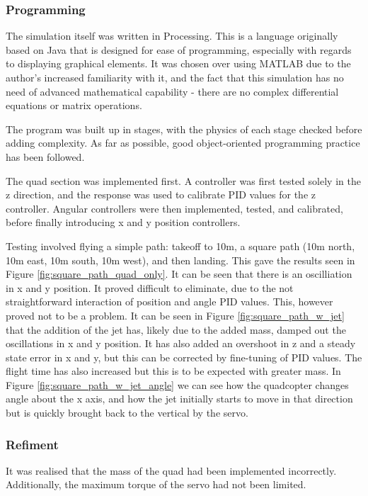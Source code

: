 \documentclass[11pt]{article}
\begin{document}
\subsubsection{Programming}
The simulation itself was written in Processing. This is a language originally based on Java that is designed for ease of programming, especially with regards to displaying graphical elements. It was chosen over using MATLAB due to the author's increased familiarity with it, and the fact that this simulation has no need of advanced mathematical capability - there are no complex differential equations or matrix operations.

The program was built up in stages, with the physics of each stage checked before adding complexity. As far as possible, good object-oriented programming practice has been followed.

The quad section was implemented first. A controller was first tested solely in the z direction, and the response was used to calibrate PID values for the z controller. Angular controllers were then implemented, tested, and calibrated, before finally introducing x and y position controllers.

Testing involved flying a simple path: takeoff to 10m, a square path (10m north, 10m east, 10m south, 10m west), and then landing. This gave the results seen in Figure \ref{fig:square_path_quad_only}. It can be seen that there is an oscilliation in x and y position. It proved difficult to eliminate, due to the not straightforward interaction of position and angle PID values. This, however proved not to be a problem. It can be seen in Figure \ref{fig:square_path_w_jet} that the addition of the jet has, likely due to the added mass, damped out the oscillations in x and y position. It has also added an overshoot in z and a steady state error in x and y, but this can be corrected by fine-tuning of PID values. The flight time has also increased but this is to be expected with greater mass. In Figure \ref{fig:square_path_w_jet_angle} we can see how the quadcopter changes angle about the x axis, and how the jet initially starts to move in that direction but is quickly brought back to the vertical by the servo.

\subsubsection{Refiment}
It was realised that the mass of the quad had been implemented incorrectly. Additionally, the maximum torque of the servo had not been limited.
\end{document}
